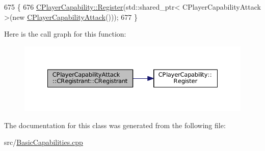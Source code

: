 \begin{DoxyCode}
675                                                \{
676     \hyperlink{classCPlayerCapability_a7e298018dcde2684451add3cfff065f7}{CPlayerCapability::Register}(std::shared\_ptr< CPlayerCapabilityAttack >(\textcolor{keyword}{new} 
      \hyperlink{classCPlayerCapabilityAttack_ae9430ec5ce80a461030603c5cab0525c}{CPlayerCapabilityAttack}()));   
677 \}
\end{DoxyCode}
Here is the call graph for this function\+:
\nopagebreak
\begin{figure}[H]
\begin{center}
\leavevmode
\includegraphics[width=350pt]{classCPlayerCapabilityAttack_1_1CRegistrant_afe5887c5ba5ae7d0b65e4820d6f9143e_cgraph}
\end{center}
\end{figure}


The documentation for this class was generated from the following file\+:\begin{DoxyCompactItemize}
\item 
src/\hyperlink{BasicCapabilities_8cpp}{Basic\+Capabilities.\+cpp}\end{DoxyCompactItemize}
